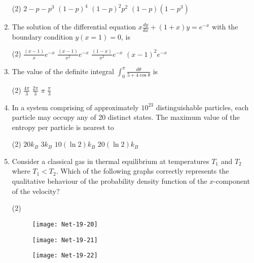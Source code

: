 \begin{enumerate}
 \begin{tasks}(2)
	\task[\textbf{a.}] $2-p-p^{3}$
	\task[\textbf{b.}] $(1-p)^{4}$
	\task[\textbf{c.}] $(1-p)^{2} p^{2}$
	\task[\textbf{d.}] $(1-p)\left(1-p^{3}\right)$
\end{tasks}
\item The solution of the differential equation $x \frac{d y}{d x}+(1+x) y=e^{-x}$ with the boundary condition $y(x=1)=0$, is
 \begin{tasks}(2)
	\task[\textbf{a.}]$\frac{(x-1)}{x} e^{-x}$
	\task[\textbf{b.}] $\frac{(x-1)}{x^{2}} e^{-x}$
	\task[\textbf{c.}] $\frac{(1-x)}{x^{2}} e^{-x}$
	\task[\textbf{d.}] $(x-1)^{2} e^{-x}$
\end{tasks}
\item The value of the definite integral $\int_{0}^{\pi} \frac{d \theta}{5+4 \cos \theta}$ is
 \begin{tasks}(2)
	\task[\textbf{a.}]$\frac{4 \pi}{3}$
	\task[\textbf{b.}] $\frac{2 \pi}{3}$
	\task[\textbf{c.}]$\pi$
	\task[\textbf{d.}]$\frac{\pi}{3}$ 
\end{tasks}
\item In a system comprising of approximately $10^{23}$ distinguishable particles, each particle may occupy any of 20 distinct states. The maximum value of the entropy per particle is nearest to
 \begin{tasks}(2)
	\task[\textbf{a.}] $20 k_{B}$
	\task[\textbf{b.}]$3 k_{B}$
	\task[\textbf{c.}]$10(\ln 2) k_{B}$
	\task[\textbf{d.}]$20(\ln 2) k_{B}$ 
\end{tasks}
\item  Consider a classical gas in thermal equilibrium at temperatures $T_{1}$ and $T_{2}$ where $T_{1}<T_{2}$. Which of the following graphs correctly represents the qualitative behaviour of the probability density function of the $x$-component of the velocity?
 \begin{tasks}(2)
	\task[\textbf{a.}]
	\begin{figure}[H]
		\centering
		\texttt{[image: Net-19-20]}
	\end{figure}
	\task[\textbf{b.}]
		\begin{figure}[H]
		\centering
		\texttt{[image: Net-19-21]}
	\end{figure}
	\task[\textbf{c.}]
		\begin{figure}[H]
		\centering
		\texttt{[image: Net-19-22]}
	\end{figure}
	\task[\textbf{d.}] 
		\begin{figure}[H]

\end{figure}
\end{tasks}
\end{enumerate}
